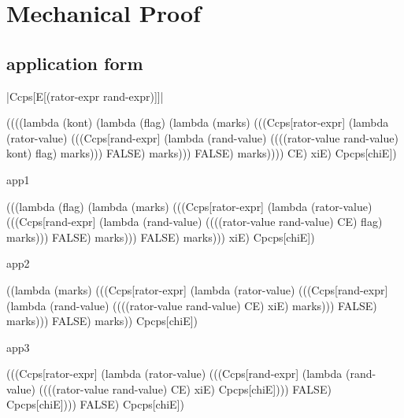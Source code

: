 \chapter{Mechanical Proof}

\section{application form}

\noindent
\scheme|Ccps[E[(rator-expr rand-expr)]]|
\begin{schemeblock}
\begin{schemedisplay}
((((lambda (kont)
     (lambda (flag)
       (lambda (marks)
         (((Ccps[rator-expr]
                (lambda (rator-value)
                  (((Ccps[rand-expr]
                         (lambda (rand-value)
                           ((((rator-value rand-value) kont) flag) marks)))
                    FALSE) marks)))
           FALSE) marks))))
   CE) xiE) Cpcps[chiE])
\end{schemedisplay}
\end{schemeblock}

\noindent
app1

\begin{schemeblock}
\begin{schemedisplay}
(((lambda (flag)
    (lambda (marks)
      (((Ccps[rator-expr]
             (lambda (rator-value)
               (((Ccps[rand-expr]
                      (lambda (rand-value)
                        ((((rator-value rand-value) CE) flag) marks)))
                 FALSE) marks)))
        FALSE) marks)))
  xiE) Cpcps[chiE])
\end{schemedisplay}
\end{schemeblock}

\noindent
app2

\begin{schemeblock}
\begin{schemedisplay}
((lambda (marks)
   (((Ccps[rator-expr]
          (lambda (rator-value)
            (((Ccps[rand-expr]
                   (lambda (rand-value)
                     ((((rator-value rand-value) CE) xiE) marks)))
              FALSE) marks)))
     FALSE) marks)) Cpcps[chiE])
\end{schemedisplay}
\end{schemeblock}

\noindent
app3

\begin{schemeblock}
\begin{schemedisplay}
(((Ccps[rator-expr]
       (lambda (rator-value)
         (((Ccps[rand-expr]
                (lambda (rand-value)
                  ((((rator-value rand-value) CE) xiE) Cpcps[chiE])))
           FALSE) Cpcps[chiE])))
  FALSE) Cpcps[chiE])
\end{schemedisplay}
\end{schemeblock}

